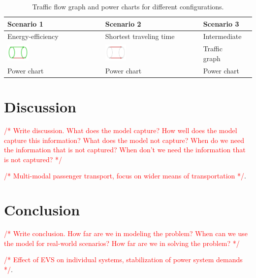 \documentclass[conference]{IEEEtran}
\newcommand{\todo}[1]{\textcolor{red}{/* #1 */}}
\begin{document}
	\begin{table}[b]
		\centering
		\renewcommand{\arraystretch}{1.3}
		\begin{tabularx}{\textwidth}{|Y|Y|Y|Y|}
			\hline
			
			\textbf{Scenario 1} & \textbf{Scenario 2} & \textbf{Scenario 3} \\
			
			\hline
			
			Energy-efficiency &
			Shortest traveling time &
			Intermediate \\
			
			\hline
			
			\includegraphics[width=0.23\textwidth, trim=0 0 0 -3]{gfx/Graph2.png} &
			\includegraphics[width=0.23\textwidth, trim=0 0 0 -3]{gfx/Graph1.png} &
			Traffic graph \\
			
			\hline
			
			Power chart &
			Power chart &
			Power chart \\
			\hline			
		\end{tabularx}
		\caption{Traffic flow graph and power charts for different configurations.}
		\label{figure:examples}
	\end{table}
	
	\section{Discussion}
	\label{discussion}
	
	\todo{Write discussion. What does the model capture? How well does the model capture this information? What does the model not capture? When do we need the information that is not captured? When don't we need the information that is not captured?}
	
	\todo{Multi-modal passenger transport, focus on wider means of transportation}.
		
	
	\section{Conclusion}
	\label{conclusion}
	
	\todo{Write conclusion. How far are we in modeling the problem? When can we use the model for real-world scenarios? How far are we in solving the problem?}
	
	\todo{Effect of EVS on individual systems, stabilization of power system demands}.
		
	
	
	
	
\end{document}

